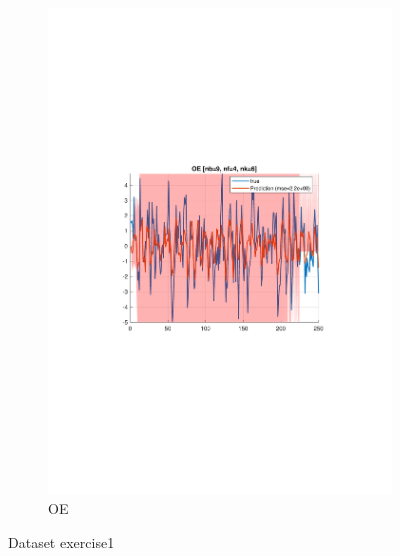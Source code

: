 \documentclass[]{article}
\begin{document}
\begin{figure}[ht]
\begin{subfigure}{.49\textwidth}
	\includegraphics[trim= 10cm 8cm 10cm 8cm, scale=0.4]{figures/3-OE-Ex1-idcompare.pdf}
	\caption{OE}
	\label{fig:Ex1-idcompare-OE}
\end{subfigure}
\caption{Dataset exercise1}
\label{fig:Ex1-idcompare}
\end{figure}
\end{document}
